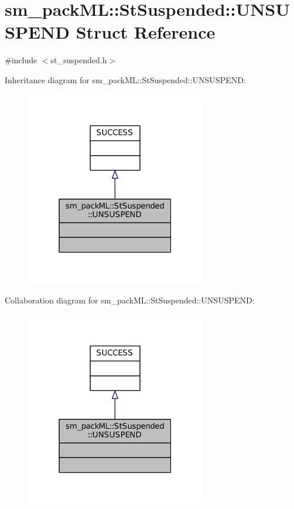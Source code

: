 \hypertarget{structsm__packML_1_1StSuspended_1_1UNSUSPEND}{}\section{sm\+\_\+pack\+ML\+:\+:St\+Suspended\+:\+:U\+N\+S\+U\+S\+P\+E\+ND Struct Reference}
\label{structsm__packML_1_1StSuspended_1_1UNSUSPEND}


{\ttfamily \#include $<$st\+\_\+suspended.\+h$>$}



Inheritance diagram for sm\+\_\+pack\+ML\+:\+:St\+Suspended\+:\+:U\+N\+S\+U\+S\+P\+E\+ND\+:
\nopagebreak
\begin{figure}[H]
\begin{center}
\leavevmode
\includegraphics[width=223pt]{structsm__packML_1_1StSuspended_1_1UNSUSPEND__inherit__graph}
\end{center}
\end{figure}


Collaboration diagram for sm\+\_\+pack\+ML\+:\+:St\+Suspended\+:\+:U\+N\+S\+U\+S\+P\+E\+ND\+:
\nopagebreak
\begin{figure}[H]
\begin{center}
\leavevmode
\includegraphics[width=223pt]{structsm__packML_1_1StSuspended_1_1UNSUSPEND__coll__graph}
\end{center}
\end{figure}


